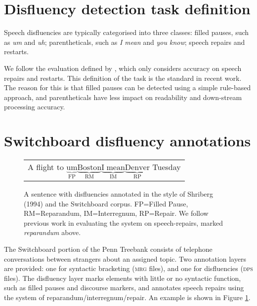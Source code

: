 \documentclass[11pt,letterpaper]{article}
\begin{document}
\section{Disfluency detection task definition}

Speech disfluencies are typically categorised into three classes:
filled pauses, such as \emph{um} and \emph{uh};
parentheticals, such as \emph{I mean} and \emph{you know};
speech repairs and restarts.

We follow the evaluation defined by \citet{Charniak01a}, which only considers
accuracy on speech repairs and restarts.  This definition of the task is the 
standard in recent work. The reason for this is that filled pauses can be
detected using a simple rule-based approach, and parentheticals have less impact
on readability and down-stream processing accuracy.

\section{Switchboard disfluency annotations}
\label{sec:swbd}

\begin{figure}
    \begin{tabular}{l}

        A flight to $\underbrace{\mathrm{um}}_\text{FP} \underbrace{\mathrm{Boston}}_\text{RM} \underbrace{\mathrm{I\;mean}}_\text{IM} \underbrace{\mathrm{Denver}}_\text{RP}$ Tuesday\\

\end{tabular}
\caption{\small A sentence with disfluencies annotated in the style of Shriberg (1994) 
    and the Switchboard corpus.
FP=Filled Pause, RM=Reparandum, IM=Interregnum, RP=Repair.
We follow previous work in evaluating the system on speech-repairs,
marked \emph{reparandum} above.
\label{fig:shriberg}}
\end{figure}

The Switchboard portion of the Penn Treebank \citep{marcus:93} consists of
telephone conversations between strangers about
an assigned topic.  Two annotation layers are provided: one for syntactic
bracketing (\textsc{mrg} files),
and one for disfluencies (\textsc{dps} files).  The disfluency layer marks
elements with little or no syntactic function, such as filled pauses and discourse
markers, and annotates speech repairs using the \citet{shriberg:94} system of
reparandum/interregnum/repair. An example is shown in Figure \ref{fig:shriberg}.
\end{document}
